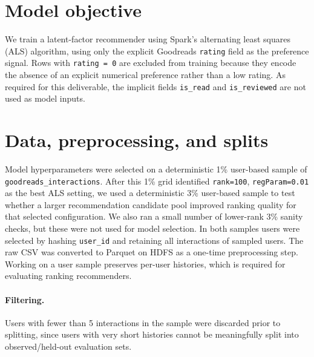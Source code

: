 \documentclass[10pt,twocolumn]{article}
\begin{document}

\section{Model objective}
We train a latent-factor recommender using Spark's alternating least squares (ALS) algorithm, using only the explicit Goodreads \texttt{rating} field as the preference signal. Rows with \texttt{rating = 0} are excluded from training because they encode the absence of an explicit numerical preference rather than a low rating. As required for this deliverable, the implicit fields \texttt{is\_read} and \texttt{is\_reviewed} are not used as model inputs.

\section{Data, preprocessing, and splits}
Model hyperparameters were selected on a deterministic 1\% user-based sample of \texttt{goodreads\_interactions}. After this 1\% grid identified \texttt{rank=100}, \texttt{regParam=0.01} as the best ALS setting, we used a deterministic 3\% user-based sample to test whether a larger recommendation candidate pool improved ranking quality for that selected configuration. We also ran a small number of lower-rank 3\% sanity checks, but these were not used for model selection. In both samples users were selected by hashing \texttt{user\_id} and retaining all interactions of sampled users. The raw CSV was converted to Parquet on HDFS as a one-time preprocessing step. Working on a user sample preserves per-user histories, which is required for evaluating ranking recommenders.

\paragraph{Filtering.} Users with fewer than 5 interactions in the sample were discarded prior to splitting, since users with very short histories cannot be meaningfully split into observed/held-out evaluation sets.
\end{document}
